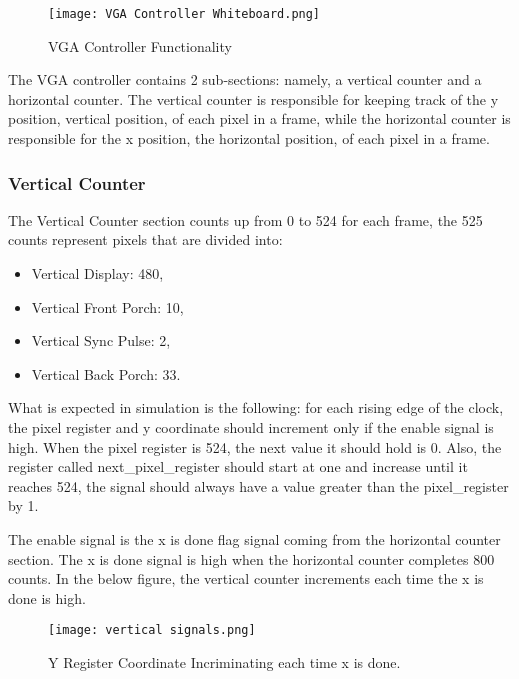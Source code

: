 \begin{figure}[H]
    \centering
    \texttt{[image: VGA Controller Whiteboard.png]}
    \caption{ VGA Controller Functionality }
    \label{fig:VGAWB}  
\end{figure}

\par The VGA controller contains 2 sub-sections: namely, a vertical counter and a horizontal counter. The vertical counter is responsible for keeping track of the y position, vertical position, of each pixel in a frame, while the horizontal counter is responsible for the x position, the horizontal position, of each pixel in a frame.  \newline

\subsubsection{Vertical Counter}

\par The Vertical Counter section counts up from 0 to 524 for each frame, the 525 counts represent pixels that are divided into: 
\begin{itemize}
    \item Vertical Display: 480,
    \item Vertical Front Porch: 10,
    \item Vertical Sync Pulse: 2,
    \item Vertical Back Porch: 33.
\end{itemize}

\par What is expected in simulation is the following: for each rising edge of the clock, the pixel register and y coordinate should increment only if the enable signal is high. When the pixel register is 524, the next value it should hold is 0. Also, the register called next\_pixel\_register should start at one and increase until it reaches 524, the signal should always have a value greater than the pixel\_register by 1. \newline
\par The enable signal is the x is done flag signal coming from the horizontal counter section. The x is done signal is high when the horizontal counter completes 800 counts. In the below figure, the vertical counter increments each time the x is done is high. \newline

\begin{figure}[H]
    \centering
    \texttt{[image: vertical signals.png]}
    \caption{ Y Register Coordinate Incriminating each time x is done.}
    \label{fig:VSigs}  
\end{figure}


